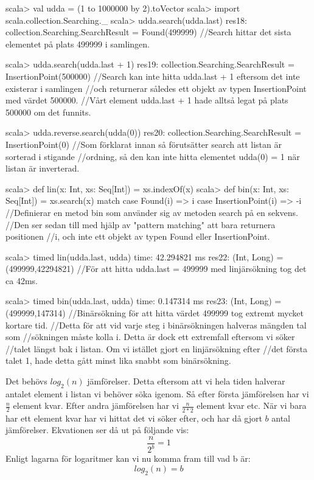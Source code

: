 \begin{REPLnonum}
scala> val udda = (1 to 1000000 by 2).toVector
scala> import scala.collection.Searching._
scala> udda.search(udda.last)
res18: collection.Searching.SearchResult = Found(499999)
//Search hittar det sista elementet på plats 499999 i samlingen.

scala> udda.search(udda.last + 1)
res19: collection.Searching.SearchResult = InsertionPoint(500000)
//Search kan inte hitta udda.last + 1 eftersom det inte existerar i samlingen
//och returnerar således ett objekt av typen InsertionPoint med värdet 500000.
//Vårt element udda.last + 1 hade alltså legat på plats 500000 om det funnits.

scala> udda.reverse.search(udda(0))
res20: collection.Searching.SearchResult = InsertionPoint(0)
//Som förklarat innan så förutsätter search att listan är sorterad i stigande
//ordning, så den kan inte hitta elementet udda(0) = 1 när listan är inverterad.

scala> def lin(x: Int, xs: Seq[Int]) = xs.indexOf(x)
scala> def bin(x: Int, xs: Seq[Int]) = xs.search(x) match {
	case Found(i) => i
	case InsertionPoint(i) => -i
}
//Definierar en metod bin som använder sig av metoden search på en sekvens.
//Den ser sedan till med hjälp av "pattern matching" att bara returnera positionen
//i, och inte ett objekt av typen Found eller InsertionPoint.

scala> timed{ lin(udda.last, udda) }
time: 42.294821 ms
res22: (Int, Long) = (499999,42294821)
//För att hitta udda.last = 499999 med linjärsökning tog det ca 42ms.

scala> timed{ bin(udda.last, udda) }
time: 0.147314 ms
res23: (Int, Long) = (499999,147314)
//Binärsökning för att hitta värdet 499999 tog extremt mycket kortare tid.
//Detta för att vid varje steg i binärsökningen halveras mängden tal som
//sökningen måste kolla i. Detta är dock ett extremfall eftersom vi söker
//talet längst bak i listan. Om vi istället gjort en linjärsökning efter
//det första talet 1, hade detta gått minst lika snabbt som binärsökning.
\end{REPLnonum}

\SubtaskSolved
Det behövs $log_2(n)$ jämförelser. Detta eftersom att vi hela tiden halverar antalet element i listan vi behöver söka igenom. Så efter första jämförelsen har vi $\frac{n}{2}$ element kvar. Efter andra jämförelsen har vi $\frac{n}{2*2}$ element kvar etc. När vi bara har ett element kvar har vi hittat det vi söker efter, och har då gjort $b$ antal jämförelser. Ekvationen ser då ut på följande vis:
\begin{equation*}
\frac{n}{2^b} = 1
\end{equation*}
Enligt lagarna för logaritmer kan vi nu komma fram till vad b är:
\begin{equation*}
log_2(n) = b
\end{equation*}

